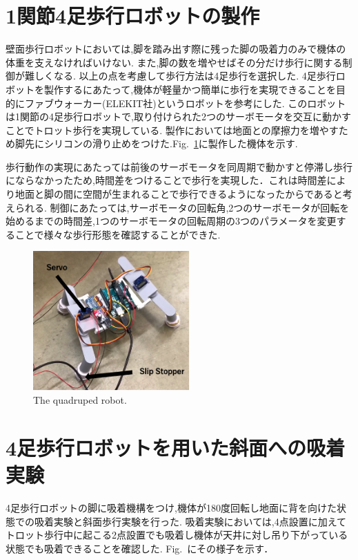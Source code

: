 \documentclass[uplatex,dvipdfmx]{jlreq}
\begin{document}
\section{1関節4足歩行ロボットの製作}
壁面歩行ロボットにおいては,脚を踏み出す際に残った脚の吸着力のみで機体の体重を支えなければいけない.
また,脚の数を増やせばその分だけ歩行に関する制御が難しくなる.
以上の点を考慮して歩行方法は4足歩行を選択した.
4足歩行ロボットを製作するにあたって,機体が軽量かつ簡単に歩行を実現できることを目的にファブウォーカー(ELEKIT社)というロボットを参考にした.
このロボットは1関節の4足歩行ロボットで,取り付けられた2つのサーボモータを交互に動かすことでトロット歩行を実現している.
製作においては地面との摩擦力を増やすため脚先にシリコンの滑り止めをつけた.Fig.~\ref{fig:quadruped_robot}に製作した機体を示す.

歩行動作の実現にあたっては前後のサーボモータを同周期で動かすと停滞し歩行にならなかったため,時間差をつけることで歩行を実現した．これは時間差により地面と脚の間に空間が生まれることで歩行できるようになったからであると考えられる.
制御にあたっては,サーボモータの回転角,2つのサーボモータが回転を始めるまでの時間差,1つのサーボモータの回転周期の3つのパラメータを変更することで様々な歩行形態を確認することができた.

\begin{figure}
    \centering
    \includegraphics[width=60mm]{./figure/4legbot.png}
    \caption{The quadruped robot.}
    \label{fig:quadruped_robot}
\end{figure}

\section{4足歩行ロボットを用いた斜面への吸着実験}
4足歩行ロボットの脚に吸着機構をつけ,機体が180度回転し地面に背を向けた状態での吸着実験と斜面歩行実験を行った.
吸着実験においては,4点設置に加えてトロット歩行中に起こる2点設置でも吸着し機体が天井に対し吊り下がっている状態でも吸着できることを確認した.
Fig.~にその様子を示す．
\end{document}
